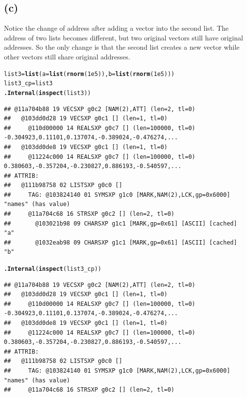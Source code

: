 \documentclass{article}\usepackage[]{graphicx}\usepackage[]{color}
\makeatletter
\newcommand{\hlnum}[1]{\textcolor[rgb]{0.686,0.059,0.569}{#1}}%
\newcommand{\hlstd}[1]{\textcolor[rgb]{0.345,0.345,0.345}{#1}}%
\newcommand{\hlkwb}[1]{\textcolor[rgb]{0.69,0.353,0.396}{#1}}%
\newcommand{\hlkwc}[1]{\textcolor[rgb]{0.333,0.667,0.333}{#1}}%
\newcommand{\hlkwd}[1]{\textcolor[rgb]{0.737,0.353,0.396}{\textbf{#1}}}%
\newenvironment{kframe}{%
 \def\at@end@of@kframe{}%
 \ifinner\ifhmode%
  \def\at@end@of@kframe{\end{minipage}}%
  \begin{minipage}{\columnwidth}%
 \fi\fi%
 \def\FrameCommand##1{\hskip\@totalleftmargin \hskip-\fboxsep
 \colorbox{shadecolor}{##1}\hskip-\fboxsep
     \hskip-\linewidth \hskip-\@totalleftmargin \hskip\columnwidth}%
 \MakeFramed {\advance\hsize-\width
   \@totalleftmargin\z@ \linewidth\hsize
   \@setminipage}}%
 {\par\unskip\endMakeFramed%
 \at@end@of@kframe}
\newenvironment{knitrout}{}{} %
\makeatother
\begin{document}
\subsection{(c)}
Notice the change of address after adding a vector into the second list. The address of two lists becomes different, but two original vectors still have original addresses. So the only change is that the second list creates a new vector while other vectors still share original addresses.
\begin{knitrout}
\color{fgcolor}\begin{kframe}
\begin{alltt}
\hlstd{list3}\hlkwb{=}\hlkwd{list}\hlstd{(}\hlkwc{a}\hlstd{=}\hlkwd{list}\hlstd{(}\hlkwd{rnorm}\hlstd{(}\hlnum{1e5}\hlstd{)),}\hlkwc{b}\hlstd{=}\hlkwd{list}\hlstd{(}\hlkwd{rnorm}\hlstd{(}\hlnum{1e5}\hlstd{)))}
\hlstd{list3_cp}\hlkwb{=}\hlstd{list3}
\hlkwd{.Internal}\hlstd{(}\hlkwd{inspect}\hlstd{(list3))}
\end{alltt}
\begin{verbatim}
## @11a704b88 19 VECSXP g0c2 [NAM(2),ATT] (len=2, tl=0)
##   @103dd0d28 19 VECSXP g0c1 [] (len=1, tl=0)
##     @110d00000 14 REALSXP g0c7 [] (len=100000, tl=0) -0.304923,0.11101,0.137074,-0.389024,-0.476274,...
##   @103dd0de8 19 VECSXP g0c1 [] (len=1, tl=0)
##     @11224c000 14 REALSXP g0c7 [] (len=100000, tl=0) 0.380603,-0.357204,-0.230827,0.886193,-0.540597,...
## ATTRIB:
##   @111b98758 02 LISTSXP g0c0 [] 
##     TAG: @103824140 01 SYMSXP g1c0 [MARK,NAM(2),LCK,gp=0x6000] "names" (has value)
##     @11a704c68 16 STRSXP g0c2 [] (len=2, tl=0)
##       @103021b98 09 CHARSXP g1c1 [MARK,gp=0x61] [ASCII] [cached] "a"
##       @1032eab98 09 CHARSXP g1c1 [MARK,gp=0x61] [ASCII] [cached] "b"
\end{verbatim}
\begin{alltt}
\hlkwd{.Internal}\hlstd{(}\hlkwd{inspect}\hlstd{(list3_cp))}
\end{alltt}
\begin{verbatim}
## @11a704b88 19 VECSXP g0c2 [NAM(2),ATT] (len=2, tl=0)
##   @103dd0d28 19 VECSXP g0c1 [] (len=1, tl=0)
##     @110d00000 14 REALSXP g0c7 [] (len=100000, tl=0) -0.304923,0.11101,0.137074,-0.389024,-0.476274,...
##   @103dd0de8 19 VECSXP g0c1 [] (len=1, tl=0)
##     @11224c000 14 REALSXP g0c7 [] (len=100000, tl=0) 0.380603,-0.357204,-0.230827,0.886193,-0.540597,...
## ATTRIB:
##   @111b98758 02 LISTSXP g0c0 [] 
##     TAG: @103824140 01 SYMSXP g1c0 [MARK,NAM(2),LCK,gp=0x6000] "names" (has value)
##     @11a704c68 16 STRSXP g0c2 [] (len=2, tl=0)

\end{verbatim}
\end{kframe}
\end{knitrout}
\end{document}
